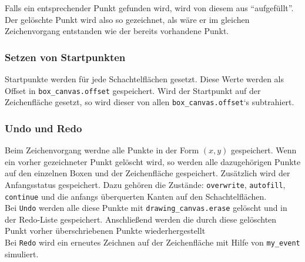 Falls ein entsprechender Punkt gefunden wird, wird von diesem aus "`aufgefüllt"'. Der gelöschte Punkt wird also so gezeichnet, als wäre er im gleichen Zeichenvorgang entstanden wie der bereits vorhandene Punkt.\\ 


\subsubsection{Setzen von Startpunkten}
\label{subsubsec:startpunkte}
Startpunkte werden für jede Schachtelflächen gesetzt. Diese Werte werden als Offset in \texttt{box\_canvas.offset} gespeichert. Wird der Startpunkt auf der Zeichenfläche gesetzt, so wird dieser von allen \texttt{box\_canvas.offset}`s subtrahiert.


\subsubsection{Undo und Redo}
\label{subsubsec:undoRedo}

Beim Zeichenvorgang werdne alle Punkte in der Form $(x,y)$ gespeichert. Wenn ein vorher gezeichneter Punkt gelöscht wird, so werden alle dazugehörigen Punkte auf den einzelnen Boxen und der Zeichenfläche gespeichert. Zusätzlich wird der Anfangsstatus gespeichert. Dazu gehören die Zustände: \texttt{overwrite}, \texttt{autofill}, \texttt{continue} und die anfangs überquerten Kanten auf den Schachtelflächen.\\

Bei \texttt{Undo} werden alle diese Punkte mit \texttt{drawing\_canvas.erase} gelöscht und in der Redo-Liste gespeichert. Anschließend werden die durch diese gelöschten Punkt vorher überschriebenen Punkte wiederhergestellt\\

Bei \texttt{Redo} wird ein erneutes Zeichnen auf der Zeichenfläche mit Hilfe
von \texttt{my\_event} simuliert.\\


